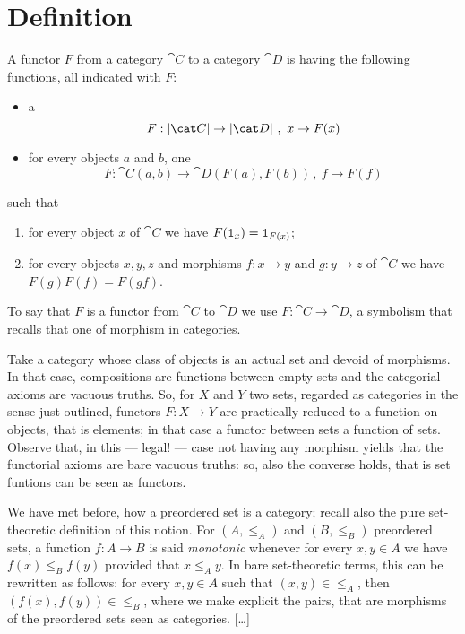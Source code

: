 
\section{Definition}

\begin{definition}[Functors]\label{definition:Functors}
A functor \(F\) from a category \(\cat C\) to a category \(\cat D\) is having the following functions, all indicated with \(F\):
\begin{itemize}
\item a 
\[F : \obj{\cat C} \to \obj{\cat D}\,,\ x \to F(x)\]
\item for every objects \(a\) and  \(b\), one 
\[F : \cat C(a, b) \to \cat D(F(a), F(b))\,,\ f \to F(f)\]
\end{itemize}
such that
\begin{enumerate}
\item for every object \(x\) of \(\cat C\) we have \(F(\mathtt 1_x) = \mathtt 1_{F(x)}\);
\item for every objects \(x, y, z\) and morphisms \(f : x \to y\) and \(g : y \to z\) of \(\cat C\) we have \(F(g) F(f) = F(gf)\).
\end{enumerate}
To say that \(F\) is a functor from \(\cat C\) to \(\cat D\) we use \(F : \cat C \to \cat D\), a symbolism that recalls that one of morphism in categories.
\end{definition}

\begin{example}
Take a category whose class of objects is an actual set and devoid of morphisms. In that case, compositions are functions between empty sets and the categorial axioms are vacuous truths. So, for \(X\) and \(Y\) two sets, regarded as categories in the sense just outlined, functors \(F : X \to Y\) are practically reduced to a function on objects, that is elements; in that case a functor between sets  a function of sets. Observe that, in this --- legal! --- case not having any morphism yields that the functorial axioms are bare vacuous truths: so, also the converse holds, that is set funtions can be seen as functors. 
\end{example}

\begin{example}
We have met before, how a preordered set is a category; recall also the pure set-theoretic definition of this notion. For \((A, \le_A)\) and \((B, \le_B)\) preordered sets, a function \(f : A \to B\) is said {\em monotonic} whenever for every \(x, y \in A\) we have \(f(x) \le_B f(y)\) provided that \(x \le_A y\). In bare set-theoretic terms, this can be rewritten as follows: for every \(x, y \in A\) such that \((x, y) \in \le_A\), then \((f(x), f(y)) \in \le_B\), where  we make explicit the pairs, that are morphisms of the preordered sets seen as categories. [\dots{}]
\end{example}

